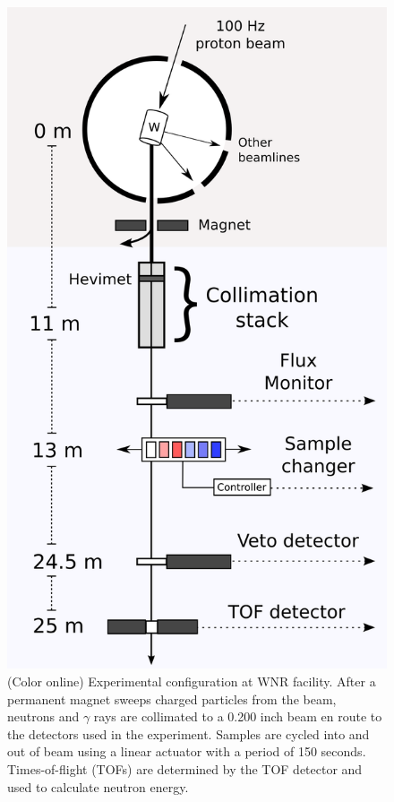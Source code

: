 \begin{figure}
    \includegraphics[scale=0.6]{figures/ExperimentalSetup.png}
    \caption{(Color online) Experimental configuration at WNR facility. After a
        permanent magnet sweeps charged particles from the beam, neutrons and
        $\gamma$ rays are collimated to a 0.200 inch beam en route to the
        detectors used in the experiment. Samples are cycled into and out of beam
        using a linear actuator with a period of 150 seconds. Times-of-flight (TOFs) are
    determined by the TOF detector and used to calculate neutron energy.}
    \label{ExperimentalApparatus}
\end{figure}

